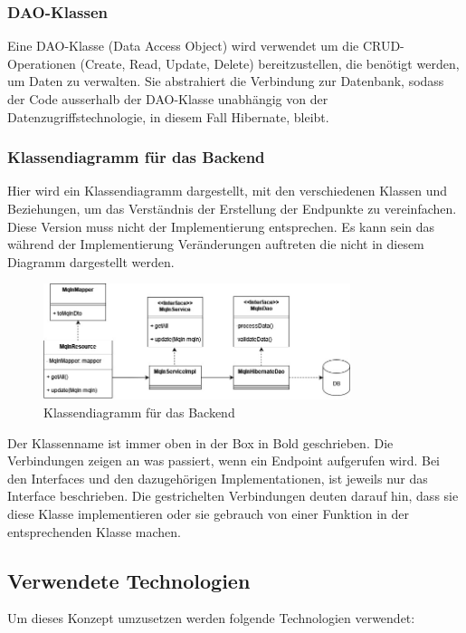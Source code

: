 \subsubsection{DAO-Klassen}
Eine DAO-Klasse (Data Access Object) wird verwendet um die CRUD-Operationen (Create, Read, Update, Delete) bereitzustellen, die benötigt werden, um Daten zu verwalten. Sie abstrahiert die Verbindung zur Datenbank, sodass der Code ausserhalb der DAO-Klasse unabhängig von der Datenzugriffstechnologie, in diesem Fall Hibernate, bleibt.

\subsubsection{Klassendiagramm für das Backend}
Hier wird ein Klassendiagramm dargestellt, mit den verschiedenen Klassen und Beziehungen, um das Verständnis der Erstellung der Endpunkte zu vereinfachen. Diese Version muss nicht der Implementierung entsprechen. Es kann sein das während der Implementierung Veränderungen auftreten die nicht in diesem Diagramm dargestellt werden.

\begin{figure}[H]
	\begin{center}
		\includegraphics[width=0.8\textwidth]{ressourcen/Klassendiagramm-Backend}
		\caption[Klassendiagramm für das Backend]{Klassendiagramm für das Backend}\label{fig:klassendiagramm-backend}
	\end{center}
\end{figure}

\noindent Der Klassenname ist immer oben in der Box in Bold geschrieben. Die Verbindungen zeigen an was passiert, wenn ein Endpoint aufgerufen wird. Bei den Interfaces und den dazugehörigen Implementationen, ist jeweils nur das Interface beschrieben. Die gestrichelten Verbindungen deuten darauf hin, dass sie diese Klasse implementieren oder sie gebrauch von einer Funktion in der entsprechenden Klasse machen.

\subsection{Verwendete Technologien}
Um dieses Konzept umzusetzen werden folgende Technologien verwendet:
